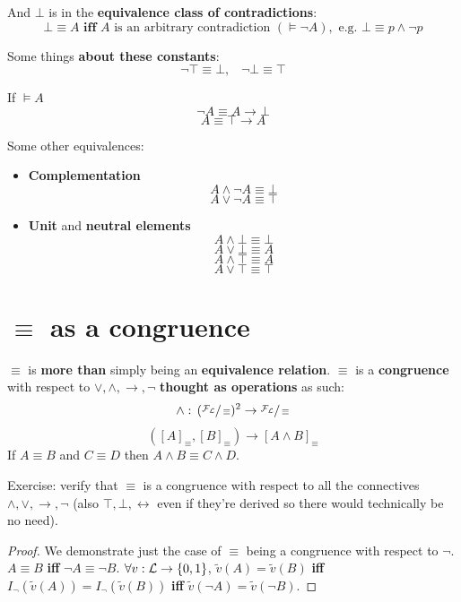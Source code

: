 	\noindent
	And $\bot$ is in the \textbf{equivalence class of contradictions}:
	$$ \bot \equiv A \textbf{ iff } A \text{ is an arbitrary contradiction } (\models \neg A), \text{ e.g. } \bot \equiv p \wedge \neg p$$

	\noindent
	Some things \textbf{about these constants}:
	$$ \neg \top \equiv \bot, \;\;\; \neg \bot \equiv \top $$

	\noindent
	If $\models A$
	$$ \neg A \equiv A \rightarrow \bot $$
	$$ A \equiv \top \rightarrow A $$

	\noindent
	Some other equivalences:
	\begin{itemize}
		\item \textbf{Complementation}
		$$ A \wedge \neg A \equiv \bot $$
		$$ A \vee \neg A \equiv \top $$

		\item \textbf{Unit} and \textbf{neutral elements}
		$$ A \wedge \bot \equiv \bot $$
		$$ A \vee \bot \equiv A $$
		$$ A \wedge \top \equiv A $$
		$$ A \vee \top \equiv \top $$
	\end{itemize} \vspace{-1cm}

	\section{$\equiv$ as a congruence}

	$\equiv$ is \textbf{more than} simply being an \textbf{equivalence relation}. $\equiv$ is a \textbf{congruence} with respect to $\vee, \wedge, \rightarrow, \neg$ \textbf{thought as operations} as such:
	$$ \wedge : \, (\sfrac{\mathcal{F}_\mathcal{L}}{\equiv})^2 \rightarrow \sfrac{\mathcal{F}_\mathcal{L}}{\equiv} $$
	$$ ([A]_\equiv, [B]_\equiv) \rightarrow [A \wedge B]_\equiv $$
	If $A \equiv B$ and $C \equiv D$ then $A \wedge B \equiv C \wedge D$.

	\noindent
	Exercise: verify that $\equiv$ is a congruence with respect to all the connectives $\wedge, \vee, \rightarrow, \neg$ (also $\top, \bot, \leftrightarrow$ even if they're derived so there would technically be no need).

	\begin{proof}
		We demonstrate just the case of $\equiv$ being a congruence with respect to $\neg$.\\
		$A \equiv B$ \textbf{ iff } $\neg A \equiv \neg B$. $\forall v: \mathcal{L} \rightarrow \{0,1\}$, $\tilde{v}(A) = \tilde{v}(B)$ \textbf{ iff } $I_\neg (\tilde{v}(A)) = I_\neg (\tilde{v}(B))$ \textbf{ iff } $\tilde{v}(\neg A) = \tilde{v}(\neg B)$.
	\end{proof}

